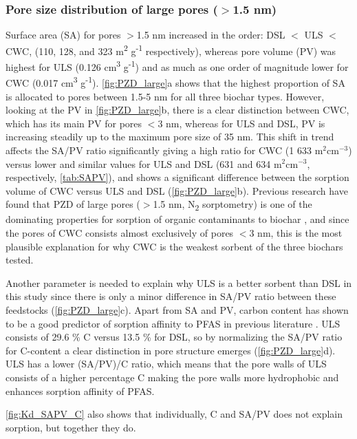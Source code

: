 \subsubsection{Pore size distribution of large pores ($>$1.5 nm)}
Surface area (SA) for pores $>$1.5 nm increased in the order: DSL $<$ ULS $<$ CWC, (110, 128, and 323 m\textsuperscript{2} g\textsuperscript{-1} respectively), whereas pore volume (PV) was highest for ULS (0.126 cm\textsuperscript{3} g\textsuperscript{-1}) and as much as one order of magnitude lower for CWC (0.017 cm\textsuperscript{3} g\textsuperscript{-1}). \cref{fig:PZD_large}a shows that the highest proportion of SA is allocated to pores between 1.5-5 nm for all three biochar types. However, looking at the PV in \cref{fig:PZD_large}b, there is a clear distinction between CWC, which has its main PV for pores $<$3 nm, whereas for ULS and DSL, PV is increasing steadily up to the maximum pore size of 35 nm. This shift in trend affects the SA/PV ratio significantly giving a high ratio for CWC (1 633 $\mathrm{m^2 cm^{-3}}$) versus lower and similar values for ULS and DSL (631 and 634 $\mathrm{m^2 cm^{-3}}$, respectively, \cref{tab:SAPV}), and shows a significant difference between the sorption volume of CWC versus ULS and DSL (\cref{fig:PZD_large}b). Previous research have found that PZD of large pores ($>$1.5 nm, N\textsubscript{2} sorptometry) is one of the dominating properties for sorption of organic contaminants to biochar \citep{Sormo2021,Hale2016,Ahmad2014}, and since the pores of CWC consists almost exclusively of pores $<$3 nm, this is the most plausible explanation for why CWC is the weakest sorbent of the three biochars tested. 

Another parameter is needed to explain why ULS is a better sorbent than DSL in this study since there is only a minor difference in SA/PV ratio between these feedstocks (\cref{fig:PZD_large}c). Apart from SA and PV, carbon content has shown to be a good predictor of sorption affinity to PFAS in previous literature \citep{Hale2016}. ULS consists of 29.6 \% C versus 13.5 \% for DSL, so by normalizing the SA/PV ratio for C-content a clear distinction in pore structure emerges (\cref{fig:PZD_large}d). ULS has a lower (SA/PV)/C ratio, which means that the pore walls of ULS consists of a higher percentage C making the pore walls more hydrophobic and enhances sorption affinity of PFAS. 

\cref{fig:Kd_SAPV_C} also shows that individually, C and SA/PV does not explain sorption, but together they do.  

